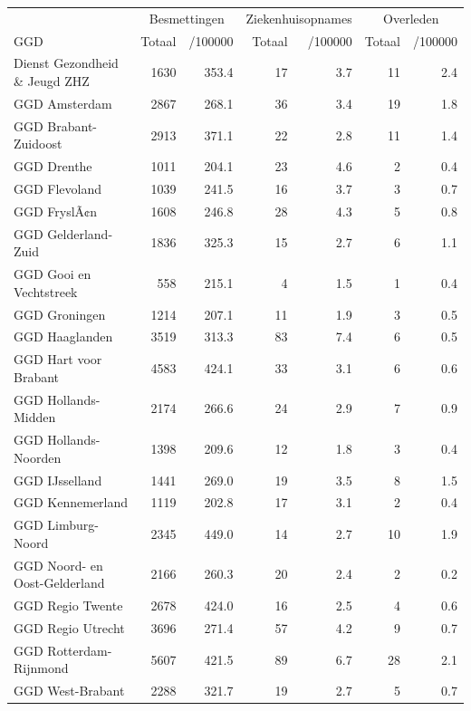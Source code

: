\documentclass[
  english,
  man,floatsintext]{apa6}
\begin{document}
\begin{table}
\centering\begingroup\fontsize{10}{12}\selectfont

\begin{threeparttable}
\begin{tabular}{lrrrrrr}
\toprule
\multicolumn{1}{c}{ } & \multicolumn{2}{c}{Besmettingen} & \multicolumn{2}{c}{Ziekenhuisopnames} & \multicolumn{2}{c}{Overleden} \\
\cmidrule(l{3pt}r{3pt}){2-3} \cmidrule(l{3pt}r{3pt}){4-5} \cmidrule(l{3pt}r{3pt}){6-7}
GGD & Totaal & /100000 & Totaal & /100000 & Totaal & /100000\\
\midrule
Dienst Gezondheid \& Jeugd ZHZ & 1630 & 353.4 & 17 & 3.7 & 11 & 2.4\\
GGD Amsterdam & 2867 & 268.1 & 36 & 3.4 & 19 & 1.8\\
GGD Brabant-Zuidoost & 2913 & 371.1 & 22 & 2.8 & 11 & 1.4\\
GGD Drenthe & 1011 & 204.1 & 23 & 4.6 & 2 & 0.4\\
GGD Flevoland & 1039 & 241.5 & 16 & 3.7 & 3 & 0.7\\
GGD FryslÃ¢n & 1608 & 246.8 & 28 & 4.3 & 5 & 0.8\\
GGD Gelderland-Zuid & 1836 & 325.3 & 15 & 2.7 & 6 & 1.1\\
GGD Gooi en Vechtstreek & 558 & 215.1 & 4 & 1.5 & 1 & 0.4\\
GGD Groningen & 1214 & 207.1 & 11 & 1.9 & 3 & 0.5\\
GGD Haaglanden & 3519 & 313.3 & 83 & 7.4 & 6 & 0.5\\
GGD Hart voor Brabant & 4583 & 424.1 & 33 & 3.1 & 6 & 0.6\\
GGD Hollands-Midden & 2174 & 266.6 & 24 & 2.9 & 7 & 0.9\\
GGD Hollands-Noorden & 1398 & 209.6 & 12 & 1.8 & 3 & 0.4\\
GGD IJsselland & 1441 & 269.0 & 19 & 3.5 & 8 & 1.5\\
GGD Kennemerland & 1119 & 202.8 & 17 & 3.1 & 2 & 0.4\\
GGD Limburg-Noord & 2345 & 449.0 & 14 & 2.7 & 10 & 1.9\\
GGD Noord- en Oost-Gelderland & 2166 & 260.3 & 20 & 2.4 & 2 & 0.2\\
GGD Regio Twente & 2678 & 424.0 & 16 & 2.5 & 4 & 0.6\\
GGD Regio Utrecht & 3696 & 271.4 & 57 & 4.2 & 9 & 0.7\\
GGD Rotterdam-Rijnmond & 5607 & 421.5 & 89 & 6.7 & 28 & 2.1\\
GGD West-Brabant & 2288 & 321.7 & 19 & 2.7 & 5 & 0.7\\

\end{tabular}
\end{threeparttable}
\end{table}
\end{document}
